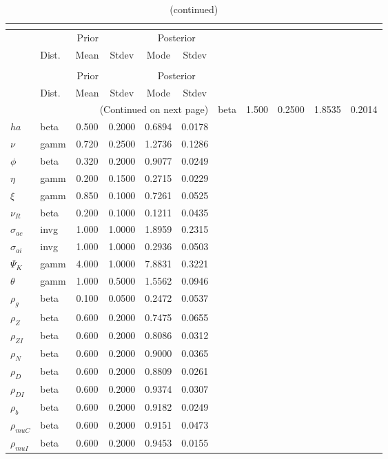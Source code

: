  
\begin{center}
\begin{longtable}{llcccc} 
\caption{Results from posterior maximization (parameters)}\\
 \label{Table:Posterior:1}\\
\toprule 
  & \multicolumn{3}{c}{Prior}  &  \multicolumn{2}{c}{Posterior} \\
  \cmidrule(r{.75em}){2-4} \cmidrule(r{.75em}){5-6}
  & Dist. & Mean  & Stdev & Mode & Stdev \\ 
\midrule \endfirsthead 
\caption{(continued)}\\
 \bottomrule 
  & \multicolumn{3}{c}{Prior}  &  \multicolumn{2}{c}{Posterior} \\
  \cmidrule(r{.75em}){2-4} \cmidrule(r{.75em}){5-6}
  & Dist. & Mean  & Stdev & Mode & Stdev \\ 
\midrule \endhead 
\bottomrule \multicolumn{6}{r}{(Continued on next page)}\endfoot 
\bottomrule\endlastfoot 
${\sigma}$ & beta &   1.500 & 0.2500 &   1.8535 &  0.2014 \\ 
${ha}$ & beta &   0.500 & 0.2000 &   0.6894 &  0.0178 \\ 
$\nu$ & gamm &   0.720 & 0.2500 &   1.2736 &  0.1286 \\ 
${\phi}$ & beta &   0.320 & 0.2000 &   0.9077 &  0.0249 \\ 
${\eta}$ & gamm &   0.200 & 0.1500 &   0.2715 &  0.0229 \\ 
$\xi$ & gamm &   0.850 & 0.1000 &   0.7261 &  0.0525 \\ 
${\nu_R}$ & beta &   0.200 & 0.1000 &   0.1211 &  0.0435 \\ 
${\sigma_{ac}}$ & invg &   1.000 & 1.0000 &   1.8959 &  0.2315 \\ 
${\sigma_{ai}}$ & invg &   1.000 & 1.0000 &   0.2936 &  0.0503 \\ 
${\Psi_{K}}$ & gamm &   4.000 & 1.0000 &   7.8831 &  0.3221 \\ 
${\theta}$ & gamm &   1.000 & 0.5000 &   1.5562 &  0.0946 \\ 
${\rho_g}$ & beta &   0.100 & 0.0500 &   0.2472 &  0.0537 \\ 
${\rho_Z}$ & beta &   0.600 & 0.2000 &   0.7475 &  0.0655 \\ 
${\rho_{ZI}}$ & beta &   0.600 & 0.2000 &   0.8086 &  0.0312 \\ 
${\rho_N}$ & beta &   0.600 & 0.2000 &   0.9000 &  0.0365 \\ 
${\rho_D}$ & beta &   0.600 & 0.2000 &   0.8809 &  0.0261 \\ 
${\rho_{DI}}$ & beta &   0.600 & 0.2000 &   0.9374 &  0.0307 \\ 
${\rho_b}$ & beta &   0.600 & 0.2000 &   0.9182 &  0.0249 \\ 
${\rho_{muC}}$ & beta &   0.600 & 0.2000 &   0.9151 &  0.0473 \\ 
${\rho_{muI}}$ & beta &   0.600 & 0.2000 &   0.9453 &  0.0155 \\ 
\end{longtable}
 \end{center}
